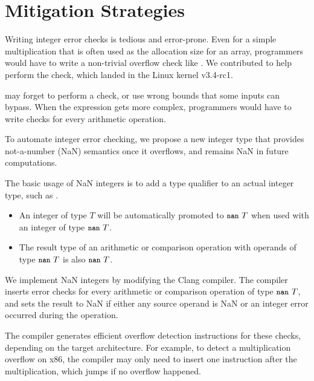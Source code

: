 \section{Mitigation Strategies}
\label{s:miti}


Writing integer error checks is tedious and error-prone.
Even for a simple multiplication  that is often used
as the allocation size for an array, programmers would
have to write a non-trivial overflow check like .  We contributed 
to help perform the check, which landed in the Linux kernel v3.4-rc1.

may forget to perform a check, or use wrong bounds that some inputs
can bypass. 
When the expression gets more complex,
programmers would have to write checks for every arithmetic operation.

To automate integer error checking, we propose a new integer type that provides
not-a-number (NaN) semantics once it overflows, and remains NaN in future
computations.

The basic usage of NaN integers is to add a type qualifier 
to an actual integer type, such as .
\begin{itemize}
\item
An integer of type $T$ will be automatically promoted to $\cc{nan}\ T$
when used with an integer of type $\cc{nan}\ T$.
\item
The result type of an arithmetic or comparison operation with
operands of type $\cc{nan}\ T$ is also $\cc{nan}\ T$.
\end{itemize}
We implement NaN integers by modifying the Clang compiler.
The compiler inserts error checks for every arithmetic or
comparison operation of type $\cc{nan}\ T$, and sets the result to
NaN if either any source operand is NaN or an integer error occurred
during the operation.

The compiler generates efficient overflow detection instructions
for these checks, depending on the target architecture.  For example,
to detect a multiplication overflow on x86, the compiler may only
need to insert one  instruction after the multiplication,
which jumps if no overflow happened.

